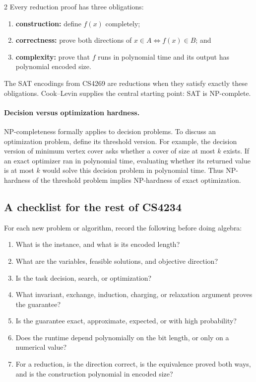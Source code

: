 \documentclass[10pt]{article}
\theoremstyle{definition}
\begin{document}
\begin{multicols*}{2}
Every reduction proof has three obligations:
\begin{enumerate}
  \item \textbf{construction:} define $f(x)$ completely;
  \item \textbf{correctness:} prove both directions of
        $x\in A\iff f(x)\in B$; and
  \item \textbf{complexity:} prove that $f$ runs in polynomial time and its
        output has polynomial encoded size.
\end{enumerate}
The SAT encodings from CS4269 are reductions when they satisfy exactly these
obligations.  Cook--Levin supplies the central starting point: SAT is
NP-complete.

\paragraph{Decision versus optimization hardness.}
NP-completeness formally applies to decision problems.  To discuss an
optimization problem, define its threshold version.  For example, the
decision version of minimum vertex cover asks whether a cover of size at most
$k$ exists.  If an exact optimizer ran in polynomial time, evaluating whether
its returned value is at most $k$ would solve this decision problem in
polynomial time.  Thus NP-hardness of the threshold problem implies NP-hardness
of exact optimization.

\subsection{A checklist for the rest of CS4234}

For each new problem or algorithm, record the following before doing algebra:
\begin{enumerate}
  \item What is the instance, and what is its encoded length?
  \item What are the variables, feasible solutions, and objective direction?
  \item Is the task decision, search, or optimization?
  \item What invariant, exchange, induction, charging, or relaxation argument
        proves the guarantee?
  \item Is the guarantee exact, approximate, expected, or with high
        probability?
  \item Does the runtime depend polynomially on the bit length, or only on a
        numerical value?
  \item For a reduction, is the direction correct, is the equivalence proved
        both ways, and is the construction polynomial in encoded size?
\end{enumerate}


\end{multicols*}
\end{document}
